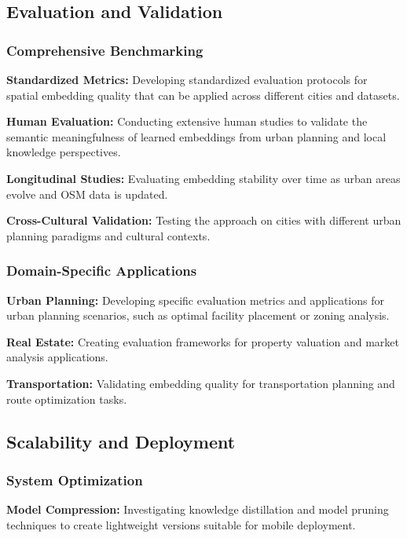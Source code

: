 \subsection{Evaluation and Validation}

\subsubsection{Comprehensive Benchmarking}

\textbf{Standardized Metrics:} Developing standardized evaluation protocols for spatial embedding quality that can be applied across different cities and datasets.

\textbf{Human Evaluation:} Conducting extensive human studies to validate the semantic meaningfulness of learned embeddings from urban planning and local knowledge perspectives.

\textbf{Longitudinal Studies:} Evaluating embedding stability over time as urban areas evolve and OSM data is updated.

\textbf{Cross-Cultural Validation:} Testing the approach on cities with different urban planning paradigms and cultural contexts.

\subsubsection{Domain-Specific Applications}

\textbf{Urban Planning:} Developing specific evaluation metrics and applications for urban planning scenarios, such as optimal facility placement or zoning analysis.

\textbf{Real Estate:} Creating evaluation frameworks for property valuation and market analysis applications.

\textbf{Transportation:} Validating embedding quality for transportation planning and route optimization tasks.

\subsection{Scalability and Deployment}

\subsubsection{System Optimization}

\textbf{Model Compression:} Investigating knowledge distillation and model pruning techniques to create lightweight versions suitable for mobile deployment.

